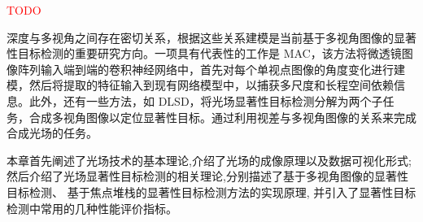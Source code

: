 \textcolor{red}{TODO}




深度与多视角之间存在密切关系，根据这些关系建模是当前基于多视角图像的显著性目标检测的重要研究方向。一项具有代表性的工作是 MAC，该方法将微透镜图像阵列输入端到端的卷积神经网络中，首先对每个单视点图像的角度变化进行建模，然后将提取的特征输入到现有网络模型中，以捕获多尺度和长程空间依赖信息。此外，还有一些方法，如 DLSD，将光场显著性目标检测分解为两个子任务，合成多视角图像以定位显著性目标。通过利用视差与多视角图像的关系来完成合成光场的任务。





本章首先阐述了光场技术的基本理论,介绍了光场的成像原理以及数据可视化形式;
然后介绍了光场显著性目标检测的相关理论,分别描述了基于多视角图像的显著性目标检测、
基于焦点堆栈的显著性目标检测方法的实现原理,
并引入了显著性目标检测中常用的几种性能评价指标。
